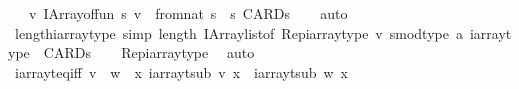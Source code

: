 \begin{isabellebody}
\ \ \ {\isachardoublequoteopen}{\isasymlambda}v{\isachardot}{\kern0pt}\ IArray{\isachardot}{\kern0pt}of{\isacharunderscore}{\kern0pt}fun\ {\isacharparenleft}{\kern0pt}{\isasymlambda}s{\isachardot}{\kern0pt}\ v\ {\isachardollar}{\kern0pt}\ {\isacharparenleft}{\kern0pt}{\isacharparenleft}{\kern0pt}from{\isacharunderscore}{\kern0pt}nat\ s{\isacharparenright}{\kern0pt}\ {\isacharcolon}{\kern0pt}{\isacharcolon}{\kern0pt}\ {\isacharprime}{\kern0pt}s{\isacharparenright}{\kern0pt}{\isacharparenright}{\kern0pt}\ {\isacharparenleft}{\kern0pt}CARD{\isacharparenleft}{\kern0pt}{\isacharprime}{\kern0pt}s{\isacharparenright}{\kern0pt}{\isacharparenright}{\kern0pt}{\isachardoublequoteclose}\isanewline
%
\isadelimproof
\ \ %
\endisadelimproof
%
\isatagproof
{}\isamarkupfalse%
\ auto%
\endisatagproof
{\isafoldproof}%
%
\isadelimproof
\isanewline
%
\endisadelimproof
\isanewline
{}\isamarkupfalse%
\ length{\isacharunderscore}{\kern0pt}iarray{\isacharunderscore}{\kern0pt}type\ {\isacharbrackleft}{\kern0pt}simp{\isacharbrackright}{\kern0pt}{\isacharcolon}{\kern0pt}\ {\isachardoublequoteopen}length\ {\isacharparenleft}{\kern0pt}IArray{\isachardot}{\kern0pt}list{\isacharunderscore}{\kern0pt}of\ {\isacharparenleft}{\kern0pt}Rep{\isacharunderscore}{\kern0pt}iarray{\isacharunderscore}{\kern0pt}type\ {\isacharparenleft}{\kern0pt}v{\isacharcolon}{\kern0pt}{\isacharcolon}{\kern0pt}\ {\isacharparenleft}{\kern0pt}{\isacharprime}{\kern0pt}s{\isacharcolon}{\kern0pt}{\isacharcolon}{\kern0pt}{\isacharbraceleft}{\kern0pt}mod{\isacharunderscore}{\kern0pt}type{\isacharbraceright}{\kern0pt}{\isacharcomma}{\kern0pt}\ {\isacharprime}{\kern0pt}a{\isacharparenright}{\kern0pt}\ iarray{\isacharunderscore}{\kern0pt}type{\isacharparenright}{\kern0pt}{\isacharparenright}{\kern0pt}{\isacharparenright}{\kern0pt}\ {\isacharequal}{\kern0pt}\ CARD{\isacharparenleft}{\kern0pt}{\isacharprime}{\kern0pt}s{\isacharparenright}{\kern0pt}{\isachardoublequoteclose}\isanewline
%
\isadelimproof
\ \ %
\endisadelimproof
%
\isatagproof
{}\isamarkupfalse%
\ Rep{\isacharunderscore}{\kern0pt}iarray{\isacharunderscore}{\kern0pt}type\ \isamarkupfalse%
\ auto%
\endisatagproof
{\isafoldproof}%
%
\isadelimproof
\isanewline
%
\endisadelimproof
\isanewline
{}\isamarkupfalse%
\ iarray{\isacharunderscore}{\kern0pt}t{\isacharunderscore}{\kern0pt}eq{\isacharunderscore}{\kern0pt}iff{\isacharcolon}{\kern0pt}\ {\isachardoublequoteopen}{\isacharparenleft}{\kern0pt}v\ {\isacharequal}{\kern0pt}\ w{\isacharparenright}{\kern0pt}\ {\isacharequal}{\kern0pt}\ {\isacharparenleft}{\kern0pt}{\isasymforall}x{\isachardot}{\kern0pt}\ iarray{\isacharunderscore}{\kern0pt}t{\isacharunderscore}{\kern0pt}sub\ v\ x\ {\isacharequal}{\kern0pt}\ iarray{\isacharunderscore}{\kern0pt}t{\isacharunderscore}{\kern0pt}sub\ w\ x{\isacharparenright}{\kern0pt}{\isachardoublequoteclose}\isanewline

\end{isabellebody}
